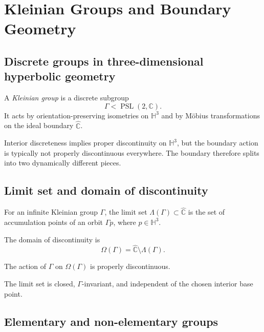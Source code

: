 \chapter{Kleinian Groups and Boundary Geometry}
\label{ch:vii37-kleinian}

\section{Discrete groups in three-dimensional hyperbolic geometry}

\begin{definition}\label{def:vii37-kleinian}
A \emph{Kleinian group} is a discrete subgroup
\[
\Gamma<\operatorname{PSL}(2,\mathbb C).
\]
It acts by orientation-preserving isometries on \(\mathbb H^3\) and by Möbius transformations on the ideal boundary \(\widehat{\mathbb C}\).
\end{definition}

Interior discreteness implies proper discontinuity on \(\mathbb H^3\), but the boundary action is typically not properly discontinuous everywhere.  The boundary therefore splits into two dynamically different pieces.


\section{Limit set and domain of discontinuity}

\begin{definition}\label{def:vii37-limitset}
For an infinite Kleinian group \(\Gamma\), the limit set \(\Lambda(\Gamma)\subset\widehat{\mathbb C}\) is the set of accumulation points of an orbit \(\Gamma p\), where \(p\in\mathbb H^3\).
\end{definition}

\begin{definition}\label{def:vii37-domain}
The domain of discontinuity is
\[
\Omega(\Gamma)=\widehat{\mathbb C}\setminus\Lambda(\Gamma).
\]
\end{definition}

\begin{theorem}\label{thm:vii37-omega-proper}
The action of \(\Gamma\) on \(\Omega(\Gamma)\) is properly discontinuous.
\end{theorem}

The limit set is closed, \(\Gamma\)-invariant, and independent of the chosen interior base point.


\section{Elementary and non-elementary groups}

